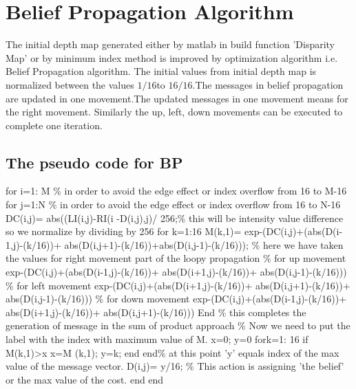 \section{Belief Propagation Algorithm}
The initial depth map generated either by matlab in build function 'Disparity Map' or by minimum index method is improved by optimization algorithm i.e. Belief Propagation algorithm.
\newline The initial values from initial depth map is normalized between the values $1/16 $to $16/16$.The messages in belief propagation are updated in one movement.The updated messages in one movement means for the right movement. Similarly the up, left, down movements can be executed to complete one iteration.
\subsection{The pseudo code for BP}

for i=1: M   \% in order to avoid the edge effect or index overflow  from 16 to M-16
\newline	for j=1:N \% in order to avoid the edge effect or index overflow from 16 to N-16
\newline	DC(i,j)= abs((LI(i,j)-RI(i -D(i,j),j)/ 256;\% this will be intensity value difference so we normalize by dividing by 256
\newline for k=1:16
\newline	M(k,1)= exp-(DC(i,j)+(abs(D(i-1,j)-(k/16))+ abs(D(i,j+1)-(k/16))+abs(D(i,j-1)-(k/16)));
\% here we have taken the values for right movement part of the loopy propagation
\newline\% for up movement exp-(DC(i,j)+(abs(D(i-1,j)-(k/16))+ abs(D(i+1,j)-(k/16))+ abs(D(i,j-1)-(k/16)))
\newline \% for left movement exp-(DC(i,j)+(abs(D(i+1,j)-(k/16))+ abs(D(i,j+1)-(k/16))+ abs(D(i,j-1)-(k/16)))
\newline \% for down movement exp-(DC(i,j)+(abs(D(i-1,j)-(k/16))+ abs(D(i+1,j)-(k/16))+ abs(D(i,j+1)-(k/16)))
\newline	End \% this completes the generation of message in the sum of product approach
\newline\% Now we need to put the label with the index with maximum value of M.
\newline x=0;
\newline y=0
\newline	fork=1: 16
\newline		if M(k,1)>x
\newline x=M (k,1);
\newline y=k;
\newline end
\newline	end\% at this point 'y' equals index of the max value of the message vector.
\newline	D(i,j)= y/16; \% This action is assigning 'the belief' or the max value of the cost.
	\newline end
\newline end
